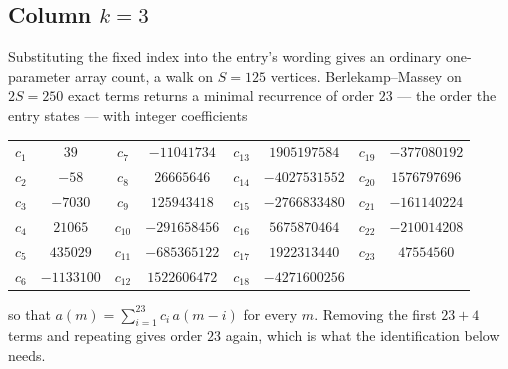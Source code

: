 \documentclass[11pt,a4paper]{article}
\theoremstyle{plain}
\theoremstyle{definition}
\begin{document}
\subsection*{Column $k=3$}
Substituting the fixed index into the entry's wording gives an ordinary one-parameter array
count, a walk on $S=125$ vertices. Berlekamp--Massey on $2S=250$ exact terms
returns a minimal recurrence of order $23$ --- the order the entry states --- with
integer coefficients
\begin{center}\small\begin{tabular}{cccccccc}
$c_{1}$ & $39$ & $c_{7}$ & $-11041734$ & $c_{13}$ & $1905197584$ & $c_{19}$ & $-377080192$ \\
$c_{2}$ & $-58$ & $c_{8}$ & $26665646$ & $c_{14}$ & $-4027531552$ & $c_{20}$ & $1576797696$ \\
$c_{3}$ & $-7030$ & $c_{9}$ & $125943418$ & $c_{15}$ & $-2766833480$ & $c_{21}$ & $-161140224$ \\
$c_{4}$ & $21065$ & $c_{10}$ & $-291658456$ & $c_{16}$ & $5675870464$ & $c_{22}$ & $-210014208$ \\
$c_{5}$ & $435029$ & $c_{11}$ & $-685365122$ & $c_{17}$ & $1922313440$ & $c_{23}$ & $47554560$ \\
$c_{6}$ & $-1133100$ & $c_{12}$ & $1522606472$ & $c_{18}$ & $-4271600256$ &  &  \\
\end{tabular}\end{center}
so that $a(m)=\sum_{i=1}^{23}c_i\,a(m-i)$ for every $m$. Removing the first
$23+4$ terms and repeating gives order $23$ again, which is what the
identification below needs.
\end{document}

